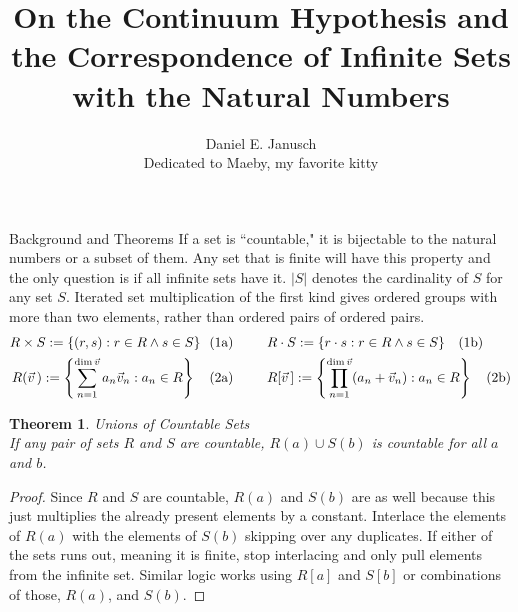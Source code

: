 \documentclass[12pt]{article}
\newtheorem{thm}{Theorem}
\begin{document}
\title{On the Continuum Hypothesis and the Correspondence of Infinite Sets with the Natural Numbers}
\author{Daniel E. Janusch\\Dedicated to Maeby, my favorite kitty}
\maketitle

\begin{section}{Background and Theorems}\label{sec:background}
	If a set is ``countable,"  it is bijectable to the natural numbers or a subset of them. Any set
	that is finite will have this property and the only question is if all infinite sets have it.
	$|S|$ denotes the cardinality of $S$ for any set $S$. Iterated set multiplication of the first
	kind gives ordered groups with more than two elements, rather than ordered pairs of ordered pairs.\\
	\begin{align}
		R\times S :=\{(r,s):r\in R\land s\in S\}~~(1 & \text a)
		\hspace{2.5em}
		R\cdot S :=\{r\cdot s:r\in R\land s\in S\}~~~(1\text b)
		\\
		R(\vec v\,):=\left\{\sum_{n=1}^{\dim\vec v}a_n\vec v_n:a_n\in R\right\}~~~(2 & \text a)
		\hspace{2.5em}
		R[\vec v\,]:=\left\{\prod_{n=1}^{\dim\vec v}(a_n+\vec v_n):a_n\in R\right\}~~~(2\text b)
	\end{align}

	\begin{thm}\label{thm:finite unions}
		\emph{Unions of Countable Sets}\\
		\indent\emph{If any pair of sets $R$ and $S$ are countable, $R(a)\cup S(b)$ is countable for all $a$ and $b$.}
	\end{thm}\begin{proof}
		Since $R$ and $S$ are countable, $R(a)$ and $S(b)$ are as well because this just
		multiplies the already present elements by a constant. Interlace the elements of
		$R(a)$ with the elements of $S(b)$ skipping over any duplicates. If either of the
		sets runs out, meaning it is finite, stop interlacing and only pull elements from
		the infinite set. Similar logic works using $R[a]$ and $S[b]$ or combinations of
		those, $R(a)$, and $S(b)$.
	\end{proof}


\end{section}
\end{document}
